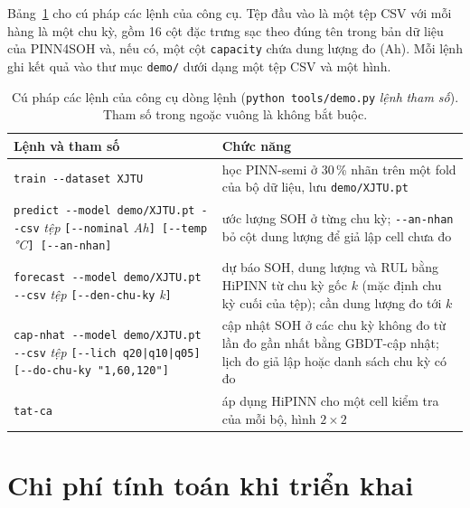 

Bảng~\ref{tab:cli} cho cú pháp các lệnh của công cụ. Tệp đầu vào là một tệp CSV với mỗi hàng là một chu kỳ, gồm 16 cột
đặc trưng sạc theo đúng tên trong bản dữ liệu của PINN4SOH và, nếu có, một cột \texttt{capacity} chứa dung lượng đo (Ah).
Mỗi lệnh ghi kết quả vào thư mục \texttt{demo/} dưới dạng một tệp CSV và một hình.

\begin{table}[!htbp]\centering\small
\caption[Cú pháp các lệnh của công cụ dòng lệnh]{Cú pháp các lệnh của công cụ dòng lệnh (\texttt{python tools/demo.py}
\textit{lệnh} \textit{tham số}). Tham số trong ngoặc vuông là không bắt buộc.}\label{tab:cli}
\begin{tabularx}{\textwidth}{>{\raggedright}p{6.4cm}>{\raggedright\arraybackslash}X}
\toprule
Lệnh và tham số & Chức năng \\
\midrule
\texttt{train -{}-dataset XJTU} & học PINN-semi ở 30\,\% nhãn trên một fold của bộ dữ liệu, lưu \texttt{demo/XJTU.pt} \\
\texttt{predict -{}-model demo/XJTU.pt -{}-csv} \textit{tệp} \texttt{[-{}-nominal} \textit{Ah}\texttt{] [-{}-temp} \textit{°C}\texttt{]
[-{}-an-nhan]} & ước lượng SOH ở từng chu kỳ; \texttt{-{}-an-nhan} bỏ cột dung lượng để giả lập cell chưa đo \\
\texttt{forecast -{}-model demo/XJTU.pt -{}-csv} \textit{tệp} \texttt{[-{}-den-chu-ky} \textit{k}\texttt{]} & dự báo SOH, dung lượng
và RUL bằng HiPINN từ chu kỳ gốc $k$ (mặc định chu kỳ cuối của tệp); cần dung lượng đo tới $k$ \\
\texttt{cap-nhat -{}-model demo/XJTU.pt -{}-csv} \textit{tệp} \texttt{[-{}-lich q20|q10|q05]} \texttt{[-{}-do-chu-ky "1,60,120"]} &
cập nhật SOH ở các chu kỳ không đo từ lần đo gần nhất bằng GBDT-cập nhật; lịch đo giả lập hoặc danh sách chu kỳ có đo \\
\texttt{tat-ca} & áp dụng HiPINN cho một cell kiểm tra của mỗi bộ, hình $2 \times 2$ \\
\bottomrule
\end{tabularx}
\end{table}

\section{Chi phí tính toán khi triển khai}\label{sec:chiphi}


